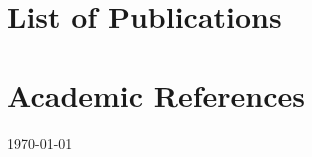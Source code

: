 \documentclass[12pt,a4paper]{moderncv}
\begin{document}
\newpage
\makecvtitle


\newpage
\section{List of Publications}




\newpage










\section{Academic References}




\emptysection{}\closesection{}
\vfill 
 \hspace{2.75cm}
 \textcolor{color2}{\today} \hfill %
\end{document}
